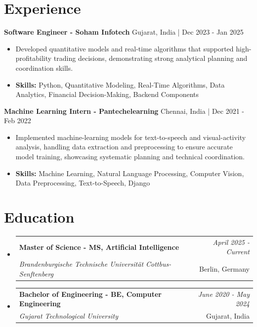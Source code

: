 \documentclass[a4paper,11pt]{article}
\makeatletter
\newcommand{\resumeSubheading}[4]{
\vspace{0.5mm}\item
    \begin{tabular*}{0.98\textwidth}[t]{l@{\extracolsep{\fill}}r}
        \textbf{#1} & \textit{\footnotesize{#4}} \\
        \textit{\footnotesize{#3}} &  \footnotesize{#2}\\
    \end{tabular*}
    \vspace{-2.4mm}
}
\makeatother
\begin{document}
\section{\textbf{Experience}}


\vspace{1mm}
  \textbf{Software Engineer - Soham Infotech} \hfill Gujarat, India | Dec 2023 - Jan 2025
\vspace{-1.5mm} %
\begin{itemize}
  \item Developed quantitative models and real-time algorithms that supported high-profitability trading decisions, demonstrating strong analytical planning and coordination skills.

\vspace{-2mm}
  \item \textbf{Skills:} Python, Quantitative Modeling, Real-Time Algorithms, Data Analytics, Financial Decision-Making, Backend Components
\end{itemize}

\vspace{1mm}
  \textbf{Machine Learning Intern - Pantechelearning} \hfill Chennai, India | Dec 2021 - Feb 2022
\vspace{-1.5mm} %
\begin{itemize}
  \item Implemented machine-learning models for text-to-speech and visual-activity analysis, handling data extraction and preprocessing to ensure accurate model training, showcasing systematic planning and technical coordination.
\vspace{-2mm}
  \item \textbf{Skills:} Machine Learning, Natural Language Processing, Computer Vision, Data Preprocessing, Text-to-Speech, Django
\end{itemize}\section{\textbf{Education}}
\vspace{-0.4mm}

\begin{itemize}
\resumeSubheading
{Master of Science - MS, Artificial Intelligence }{Berlin, Germany}
{Brandenburgische Technische Universität Cottbus-Senftenberg  }{April 2025 - Current}

\vspace{1.0mm} %
\resumeSubheading
{Bachelor of Engineering - BE, Computer Engineering  }{Gujarat, India}
{Gujarat Technological University }{June 2020 - May 2024}

\end{itemize}
\end{document}
